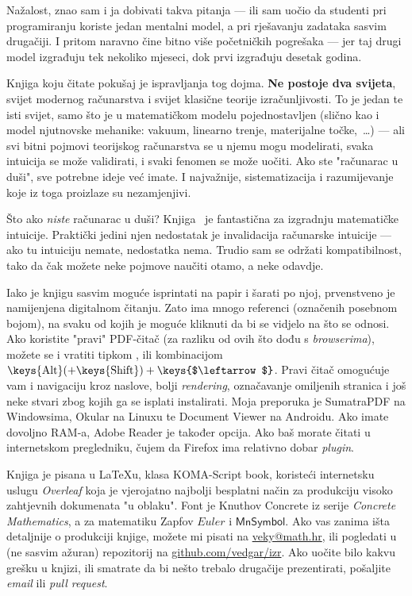 Nažalost, znao sam i ja dobivati takva pitanja --- ili sam uočio da studenti pri programiranju koriste jedan mentalni model, a pri rješavanju zadataka sasvim drugačiji. I pritom naravno čine bitno više početničkih pogrešaka --- jer taj drugi model izgrađuju tek nekoliko mjeseci, dok prvi izgrađuju desetak godina.

Knjiga koju čitate pokušaj je ispravljanja tog dojma. \textbf{Ne postoje dva svijeta}, svijet modernog računarstva i svijet klasične teorije izračunljivosti. To je jedan te isti svijet, samo što je u matematičkom modelu pojednostavljen (slično kao i model njutnovske mehanike: vakuum, linearno trenje, materijalne točke,~\ldots) --- ali svi bitni pojmovi teorijskog računarstva se u njemu mogu modelirati, svaka intuicija se može validirati, i svaki fenomen se može uočiti. Ako ste "računarac u duši", sve potrebne ideje već imate. I najvažnije, sistematizacija i razumijevanje koje iz toga proizlaze su nezamjenjivi.

Što ako \emph{niste} računarac u duši? Knjiga~\cite{skr:Vuk} je fantastična za izgradnju matematičke intuicije. Praktički jedini njen nedostatak je invalidacija računarske intuicije --- ako tu intuiciju nemate, nedostatka nema. Trudio sam se održati kompatibilnost, tako da čak možete neke pojmove naučiti otamo, a neke odavdje.


Iako je knjigu sasvim moguće isprintati na papir i šarati po njoj, prvenstveno je namijenjena digitalnom čitanju. Zato ima mnogo referenci (označenih posebnom bojom), na svaku od kojih je moguće kliknuti da bi se vidjelo na što se odnosi. Ako koristite "pravi" PDF-čitač (za razliku od ovih što dođu s \emph{browserima}), možete se i vratiti tipkom \keys{$\Mapsfrom$}, ili kombinacijom $\text{\keys{Alt}}(+\text{\keys{Shift}})+\text{\keys{$\leftarrow$}}$. Pravi čitač omogućuje vam i navigaciju kroz naslove, bolji \emph{rendering}, označavanje omiljenih stranica i još neke stvari zbog kojih ga se isplati instalirati. Moja preporuka je \textsf{SumatraPDF} na Windowsima, \textsf{Okular} na Linuxu te \textsf{Document Viewer} na Androidu. Ako imate dovoljno RAM-a, \textsf{Adobe Reader} je također opcija. Ako baš morate čitati u internetskom pregledniku, čujem da \textsf{Firefox} ima relativno dobar \emph{plugin}.

Knjiga je pisana u \textsf{\LaTeX{}}u, klasa \textsf{KOMA-Script book}, koristeći internetsku uslugu \emph{Overleaf} koja je vjerojatno najbolji besplatni način za produkciju visoko zahtjevnih dokumenata "u oblaku". Font je Knuthov Concrete iz serije \emph{Concrete Mathematics}, a za matematiku Zapfov \AmS{} $Euler$ i $\mathsf{MnSymbol}$. Ako vas zanima išta detaljnije o produkciji knjige, možete mi pisati na \href{mailto:veky@math.hr}{veky@math.hr}, ili pogledati u (ne sasvim ažuran) repozitorij na \href{https://github.com/vedgar/izr}{github.com/vedgar/izr}. Ako uočite bilo kakvu grešku u knjizi, ili smatrate da bi nešto trebalo drugačije prezentirati, pošaljite \emph{email} ili \emph{pull request}.

